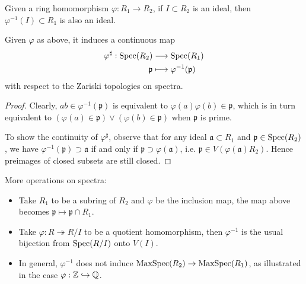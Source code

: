 Given a ring homomorphism $\varphi: R_1 \to R_2$, if $I \subset R_2$ is an ideal, then $\varphi^{-1}(I) \subset R_1$ is also an ideal.
\begin{proposition}
	Given $\varphi$ as above, it induces a continuous map
	\begin{align*}
		\varphi^\sharp: \operatorname{Spec}(R_2) & \longrightarrow \operatorname{Spec}(R_1) \\
		\mathfrak{p} & \longmapsto \varphi^{-1}(\mathfrak{p})
	\end{align*}
	with respect to the Zariski topologies on spectra.
\end{proposition}
\begin{proof}
	Clearly, $ab \in \varphi^{-1}(\mathfrak{p})$ is equivalent to $\varphi(a)\varphi(b) \in \mathfrak{p}$, which is in turn equivalent to $(\varphi(a) \in \mathfrak{p}) \vee (\varphi(b) \in \mathfrak{p})$ when $\mathfrak{p}$ is prime.
	
	To show the continuity of $\varphi^\sharp$, observe that for any ideal $\mathfrak{a} \subset R_1$ and $\mathfrak{p} \in \operatorname{Spec}(R_2)$, we have $\varphi^{-1}(\mathfrak{p}) \supset \mathfrak{a}$ if and only if $\mathfrak{p} \supset \varphi(\mathfrak{a})$, i.e. $\mathfrak{p} \in V(\varphi(\mathfrak{a}) R_2)$. Hence preimages of closed subsets are still closed.
\end{proof}

More operations on spectra:
\begin{itemize}
	\item Take $R_1$ to be a subring of $R_2$ and $\varphi$ be the inclusion map, the map above becomes $\mathfrak{p} \mapsto \mathfrak{p} \cap R_1$.
	\item Take $\varphi: R \twoheadrightarrow R/I$ to be a quotient homomorphism, then $\varphi^{-1}$ is the usual bijection from $\operatorname{Spec}(R/I)$ onto $V(I)$.
	\item In general, $\varphi^{-1}$ does not induce $\operatorname{MaxSpec}(R_2) \to \operatorname{MaxSpec}(R_1)$, as illustrated in the case $\varphi: \mathbb{Z} \hookrightarrow \mathbb{Q}$.
\end{itemize}

